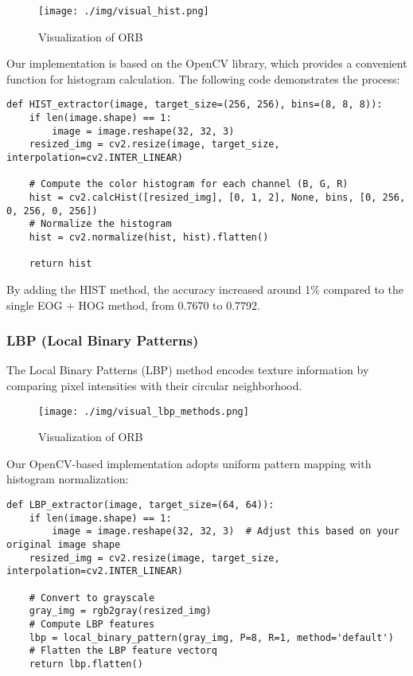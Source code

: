 \documentclass[a4paper,11pt]{article}
\begin{document}
\begin{figure}[H]
    \centering
    \texttt{[image: ./img/visual\_hist.png]}
    \caption[visual_hog] {Visualization of ORB}
\end{figure}

Our implementation is based on the OpenCV library, which provides a convenient function for histogram calculation. The following code demonstrates the process:

\begin{verbatim}
def HIST_extractor(image, target_size=(256, 256), bins=(8, 8, 8)):
    if len(image.shape) == 1:
        image = image.reshape(32, 32, 3)
    resized_img = cv2.resize(image, target_size, interpolation=cv2.INTER_LINEAR)
    
    # Compute the color histogram for each channel (B, G, R)
    hist = cv2.calcHist([resized_img], [0, 1, 2], None, bins, [0, 256, 0, 256, 0, 256])
    # Normalize the histogram
    hist = cv2.normalize(hist, hist).flatten()

    return hist
\end{verbatim}

By adding the HIST method, the accuracy increased around 1\% compared to the single EOG + HOG method, from 0.7670 to 0.7792.

\subsubsection{LBP (Local Binary Patterns)}

The Local Binary Patterns (LBP) method encodes texture information by comparing pixel intensities with their circular neighborhood.

\begin{figure}[H]
    \centering
    \texttt{[image: ./img/visual\_lbp\_methods.png]}
    \caption[visual_hog] {Visualization of ORB}
\end{figure}

Our OpenCV-based implementation adopts uniform pattern mapping with histogram normalization:

\begin{verbatim}
def LBP_extractor(image, target_size=(64, 64)):
    if len(image.shape) == 1:
        image = image.reshape(32, 32, 3)  # Adjust this based on your original image shape
    resized_img = cv2.resize(image, target_size, interpolation=cv2.INTER_LINEAR)

    # Convert to grayscale
    gray_img = rgb2gray(resized_img)
    # Compute LBP features
    lbp = local_binary_pattern(gray_img, P=8, R=1, method='default')
    # Flatten the LBP feature vectorq
    return lbp.flatten()
\end{verbatim}
\end{document}
